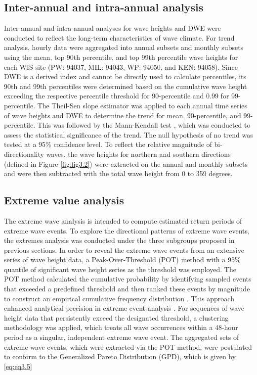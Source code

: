 \subsection{Inter-annual and intra-annual analysis}
\label{c3_Inter-annual and intra-annual analysis}
Inter-annual and intra-annual analyses for wave heights and DWE were conducted to reflect the long-term characteristics of wave climate. For trend analysis, hourly data were aggregated into annual subsets and monthly subsets using the mean, top 90th percentile, and top 99th percentile wave heights for each WIS site (PW: 94037, MIL: 94043, WP: 94050, and KEN: 94058). Since DWE is a derived index and cannot be directly used to calculate percentiles, its 90th and 99th percentiles were determined based on the cumulative wave height exceeding the respective percentile threshold for 90-percentile and 0.99 for 99-percentile. The Theil-Sen slope estimator was applied to each annual time series of wave heights and DWE to determine the trend for mean, 90-percentile, and 99-percentile. This was followed by the Mann-Kendall test \citep{kendall_new_1938,mann_nonparametric_1945}, which was conducted to assess the statistical significance of the trend. The null hypothesis of no trend was tested at a 95\% confidence level. To reflect the relative magnitude of bi-directionality waves, the wave heights for northern and southern directions (defined in Figure \ref{fig:fig3.2}) were extracted on the annual and monthly subsets and were then subtracted with the total wave height from 0 to 359 degrees.

\subsection{Extreme value analysis}
\label{c3_Extreme value analysis}
The extreme wave analysis is intended to compute estimated return periods of extreme wave events. To explore the directional patterns of extreme wave events, the extremes analysis was conducted under the three subgroups proposed in previous sections. In order to reveal the extreme wave events from an extensive series of wave height data, a Peak-Over-Threshold (POT) method with a 95\% quantile of significant wave height series as the threshold was employed. The POT method calculated the cumulative probability by identifying sampled events that exceeded a predefined threshold and then ranked these events by magnitude to construct an empirical cumulative frequency distribution \citep{bechle_meteotsunami_2015}. This approach enhanced analytical precision in extreme event analysis \citep{coles_introduction_2001}. For sequences of wave height data that persistently exceed the designated threshold, a clustering methodology was applied, which treats all wave occurrences within a 48-hour period as a singular, independent extreme wave event. The aggregated sets of extreme wave events, which were extracted via the POT method, were postulated to conform to the Generalized Pareto Distribution (GPD), which is given by \ref{eq:eq3.5}

